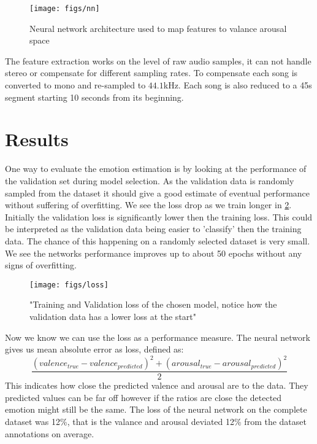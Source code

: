 \documentclass[lang=en, hanging-titles=true]{skrapport}
\begin{document}
\begin{figure}[h]
	\centering
	\texttt{[image: figs/nn]}
	\caption{Neural network architecture used to map features to valance arousal space}
	\label{fig:nn}
\end{figure}

The feature extraction works on the level of raw audio samples, it can not handle stereo or compensate for different sampling rates. To compensate each song is converted to mono and re-sampled to $44.1$kHz. Each song is also reduced to a 45s segment starting 10 seconds from its beginning.

\section{Results}
One way to evaluate the emotion estimation is by looking at the performance of the validation set during model selection. As the validation data is randomly sampled from the dataset it should give a good estimate of eventual performance without suffering of overfitting. We see the loss drop as we train longer in \cref{fig:loss}. Initially the validation loss is significantly lower then the training loss. This could be interpreted as the validation data being easier to 'classify' then the training data. The chance of this happening on a randomly selected dataset is very small. We see the networks performance improves up to about 50 epochs without any signs of overfitting. 

\begin{figure}[htbp]
	\centering
	\texttt{[image: figs/loss]}
	\caption{"Training and Validation loss of the chosen model, notice how the validation data has a lower loss at the start"}
	\label{fig:loss}
\end{figure}

Now we know we can use the loss as a performance measure. The neural network gives us mean absolute error as loss, defined as: 
\begin{equation*}
	\frac{(valence_{true} - valence_{predicted})^2 + (arousal_{true} - arousal_{predicted})^2}{2}
\end{equation*}
This indicates how close the predicted valence and arousal are to the data. They predicted values can be far off however if the ratios are close the detected emotion might still be the same. The loss of the neural network on the complete dataset was 12\%, that is the valance and arousal deviated 12\% from the dataset annotations on average.
\end{document}
